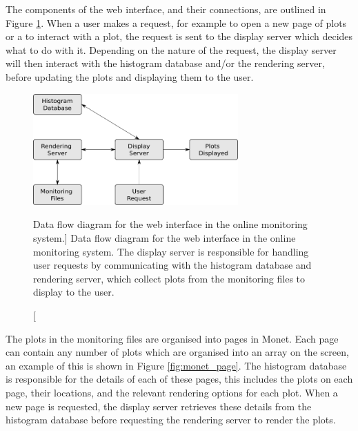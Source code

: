 The components of the web interface, and their connections, are outlined in 
Figure \ref{fig:monet_flow}. When a user makes a request, for example to open 
a new page of plots or a to interact with a plot, the request is sent to the 
display server which decides what to do with it. Depending on the nature of 
the request, the display server will then interact with the histogram database 
and/or the rendering server, before updating the plots and displaying them to 
the user. 

\begin{figure}

	\centering

	\includegraphics[width=0.7\textwidth]{figures/monet_flow.png}

	\caption
	[Data flow diagram for the web interface in the \protodune{} online 
	monitoring system.] 
	{Data flow diagram for the web interface in the \protodune{} online 
	monitoring system. The display server is responsible for handling user
	requests by communicating with the histogram database and rendering server,
	which collect plots from the monitoring files to display to the user.} 
	\label{fig:monet_flow}

\end{figure}

The plots in the monitoring files are organised into pages in Monet. Each page
can contain any number of plots which are organised into an array on the screen,
an example of this is shown in Figure \ref{fig:monet_page}. The histogram 
database is responsible for the details of each of these pages, this includes
the plots on each page, their locations, and the relevant rendering options for
each plot. When a new page is requested, the display server retrieves these
details from the histogram database before requesting the rendering server to 
render the plots.


